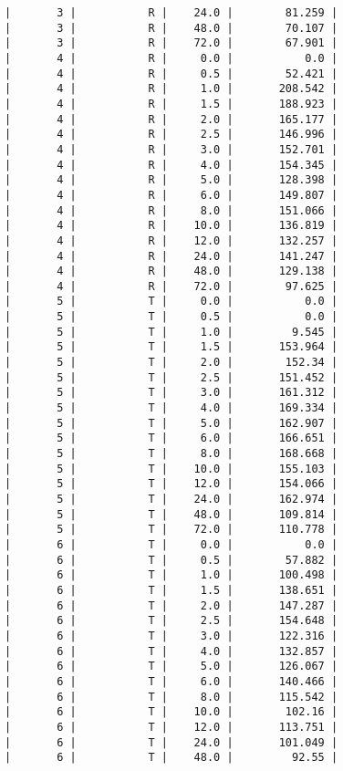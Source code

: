 \documentclass[12pt,a4paper]{article}
\begin{document}
\begin{lstlisting}
|       3 |           R |    24.0 |        81.259 |
|       3 |           R |    48.0 |        70.107 |
|       3 |           R |    72.0 |        67.901 |
|       4 |           R |     0.0 |           0.0 |
|       4 |           R |     0.5 |        52.421 |
|       4 |           R |     1.0 |       208.542 |
|       4 |           R |     1.5 |       188.923 |
|       4 |           R |     2.0 |       165.177 |
|       4 |           R |     2.5 |       146.996 |
|       4 |           R |     3.0 |       152.701 |
|       4 |           R |     4.0 |       154.345 |
|       4 |           R |     5.0 |       128.398 |
|       4 |           R |     6.0 |       149.807 |
|       4 |           R |     8.0 |       151.066 |
|       4 |           R |    10.0 |       136.819 |
|       4 |           R |    12.0 |       132.257 |
|       4 |           R |    24.0 |       141.247 |
|       4 |           R |    48.0 |       129.138 |
|       4 |           R |    72.0 |        97.625 |
|       5 |           T |     0.0 |           0.0 |
|       5 |           T |     0.5 |           0.0 |
|       5 |           T |     1.0 |         9.545 |
|       5 |           T |     1.5 |       153.964 |
|       5 |           T |     2.0 |        152.34 |
|       5 |           T |     2.5 |       151.452 |
|       5 |           T |     3.0 |       161.312 |
|       5 |           T |     4.0 |       169.334 |
|       5 |           T |     5.0 |       162.907 |
|       5 |           T |     6.0 |       166.651 |
|       5 |           T |     8.0 |       168.668 |
|       5 |           T |    10.0 |       155.103 |
|       5 |           T |    12.0 |       154.066 |
|       5 |           T |    24.0 |       162.974 |
|       5 |           T |    48.0 |       109.814 |
|       5 |           T |    72.0 |       110.778 |
|       6 |           T |     0.0 |           0.0 |
|       6 |           T |     0.5 |        57.882 |
|       6 |           T |     1.0 |       100.498 |
|       6 |           T |     1.5 |       138.651 |
|       6 |           T |     2.0 |       147.287 |
|       6 |           T |     2.5 |       154.648 |
|       6 |           T |     3.0 |       122.316 |
|       6 |           T |     4.0 |       132.857 |
|       6 |           T |     5.0 |       126.067 |
|       6 |           T |     6.0 |       140.466 |
|       6 |           T |     8.0 |       115.542 |
|       6 |           T |    10.0 |        102.16 |
|       6 |           T |    12.0 |       113.751 |
|       6 |           T |    24.0 |       101.049 |
|       6 |           T |    48.0 |         92.55 |

\end{lstlisting}
\end{document}
